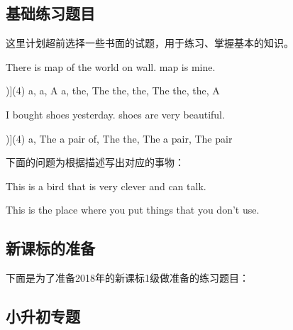 \documentclass[a4paper]{article}
\begin{document}
  \subsection{基础练习题目}

这里计划超前选择一些书面的试题，用于练习、掌握基本的知识。

\begin{question}[type=exercise]
 There is \blank[width=8mm]{} map of the world on \blank[width=8mm]{} wall. \blank[width=8mm]{} map is mine.
 \begin{tasks}[counter-format=tsk[A])](4)
 \task a, a, A
 \task a, the, The
 \task the, the, The
 \task the, the, A
\end{tasks}
\end{question}

\begin{question}[type=exercise]
 I bought \blank[width=8mm]{} shoes yesterday. \blank[width=8mm]{} shoes are very beautiful.
 \begin{tasks}[counter-format=tsk[A])](4)
 \task a, The
 \task a pair of, The
 \task the, The
 \task a pair, The pair
\end{tasks}
\end{question}

下面的问题为根据描述写出对应的事物：

\begin{question}[type=exercise] 
 This is a bird that is very clever and can talk. \hspace{0.5cm} \blank[width=2cm]{}
\end{question}

\begin{question}[type=exercise]
 This is the place where you put things that you don't use. \hspace{0.5cm} \blank[width=2cm]{}
\end{question}

  \subsection{新课标的准备}

下面是为了准备2018年的新课标1级做准备的练习题目：

\newpage

%

  \subsection{小升初专题}
\end{document}
